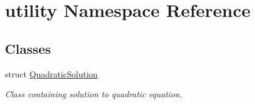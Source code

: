 \hypertarget{namespaceutility}{}\section{utility Namespace Reference}
\label{namespaceutility}
\subsection*{Classes}
\begin{DoxyCompactItemize}
\item 
struct \hyperlink{structutility_1_1QuadraticSolution}{Quadratic\+Solution}
\begin{DoxyCompactList}\small\item\em Class containing solution to quadratic equation. \end{DoxyCompactList}\end{DoxyCompactItemize}
